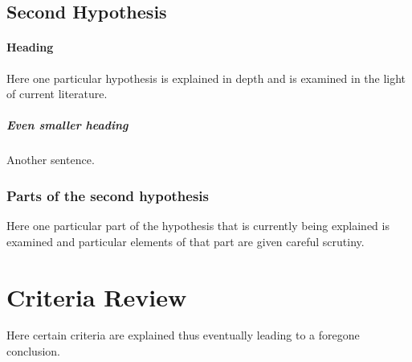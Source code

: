 \subsection{Second Hypothesis}

\paragraph{Heading} Here one particular hypothesis is explained in depth
and is examined in the light of current literature. \subparagraph{Even smaller heading} Another sentence.

\subsubsection{Parts of the second hypothesis}

Here one particular part of the hypothesis that is
currently being explained is examined and particular
elements of that part are given careful scrutiny.

\section{Criteria Review}

Here certain criteria are explained thus eventually
leading to a foregone conclusion.
